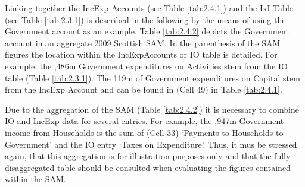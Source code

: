 \bigskip

Linking together the IncExp Accounts (see Table \ref{tab:2.4.1}) and the IxI Table (see Table \ref{tab:2.3.1}) is described in the following by the means of using the Government account as an example. Table \ref{tab:2.4.2} depicts the Government account in an aggregate 2009 Scottish SAM. In the parenthesis of the SAM figures the location within the IncExpAccounts or IO table is detailed. For example, the ,486m Government expenditures on Activities stem from the IO table (Table \ref{tab:2.3.1}). The \textsterling119m of Government expenditures on Capital stem from the IncExp Account and can be found in (Cell 49) in Table \ref{tab:2.4.1}.

\bigskip

Due to the aggregation of the SAM (Table \ref{tab:2.4.2}) it is necessary to combine IO and IncExp data for several entries. For example, the ,947m Government income from Households is the sum of (Cell 33) `Payments to Households to Government' and the IO entry `Taxes on Expenditure'. Thus, it mus be stressed again, that this aggregation is for illustration purposes only and that the fully disaggregated table should be consulted when evaluating the figures contained within the SAM.

\bigskip

